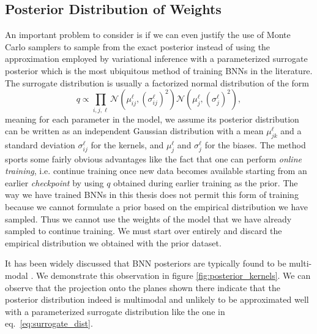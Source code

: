 \subsection{Posterior Distribution of Weights}
An important problem to consider is if we can even justify the use of Monte Carlo samplers to sample from the exact posterior instead of using the approximation employed by variational inference with a parameterized surrogate posterior which is the most ubiquitous method of training BNNs in the literature. The surrogate distribution is usually a factorized normal distribution of the form
\begin{equation}\label{eq:surrogate_dist}
    q \propto \prod_{i, j, \ell} \mathcal{N}(\mu_{ij}^\ell, (\sigma_{ij}^\ell)^2) \mathcal{N}(\mu_{j}^\ell, (\sigma_{j}^\ell)^2),
\end{equation}
meaning for each parameter in the model, we assume its posterior distribution can be written as an independent Gaussian distribution with a mean $\mu_{jk}^\ell$ and a standard deviation $\sigma_{ij}^\ell$ for the kernels, and $\mu_j^\ell$ and $\sigma_j^\ell$ for the biases. The method sports some fairly obvious advantages like the fact that one can perform \textit{online training}, i.e. continue training once new data becomes available starting from an earlier \textit{checkpoint} by using $q$ obtained during earlier training as the prior. The way we have trained BNNs in this thesis does not permit this form of training because we cannot formulate a prior based on the empirical distribution we have sampled. Thus we cannot use the weights of the model that we have already sampled to continue training. We must start over entirely and discard the empirical distribution we obtained with the prior dataset. 

It has been widely discussed that BNN posteriors are typically found to be multi-modal \cite{google_bnn_posteriors}. We demonstrate this observation in figure \ref{fig:posterior_kernels}.
We can observe that the projection onto the planes shown there indicate that the posterior distribution indeed is multimodal
and unlikely to be approximated well with a parameterized surrogate distribution like the one in eq.~\eqref{eq:surrogate_dist}.

